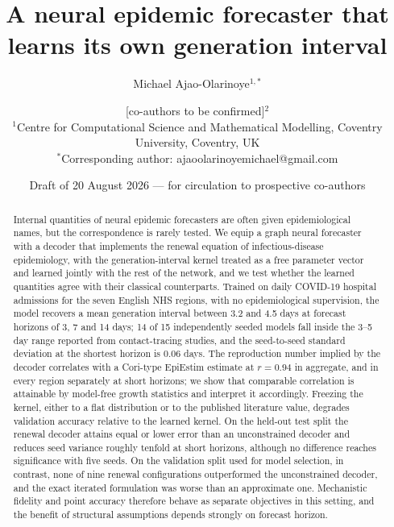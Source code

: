 \documentclass[10pt,letterpaper]{article}
\title{\vspace{-1.2em}\textbf{A neural epidemic forecaster that learns its own
generation interval}}
\author{%
Michael Ajao-Olarinoye$^{1,\ast}$ \and
[co-authors to be confirmed]$^{2}$\\[0.6em]
\small $^{1}$Centre for Computational Science and Mathematical Modelling,
Coventry University, Coventry, UK\\
\small $^{\ast}$Corresponding author: ajaoolarinoyemichael@gmail.com}
\date{Draft of 20 August 2026 --- for circulation to prospective co-authors}
\begin{document}
\maketitle

\begin{abstract}
Internal quantities of neural epidemic forecasters are often given
epidemiological names, but the correspondence is rarely tested. We equip a
graph neural forecaster with a decoder that implements the renewal equation of
infectious-disease epidemiology, with the generation-interval kernel treated
as a free parameter vector and learned jointly with the rest of the network,
and we test whether the learned quantities agree with their classical
counterparts. Trained on daily COVID-19 hospital admissions for the seven
English NHS regions, with no epidemiological supervision, the model recovers a
mean generation interval between 3.2 and 4.5 days at forecast horizons of 3,
7 and 14 days; 14 of 15 independently seeded models fall inside the 3--5 day
range reported from contact-tracing studies, and the seed-to-seed standard
deviation at the shortest horizon is 0.06 days. The reproduction number
implied by the decoder correlates with a Cori-type EpiEstim estimate at
$r=0.94$ in aggregate, and in every region separately at short horizons; we
show that comparable correlation is attainable by model-free growth
statistics and interpret it accordingly. Freezing
the kernel, either to a flat distribution or to the published literature
value, degrades validation accuracy relative to the learned kernel. On the
held-out test split the renewal decoder attains equal or lower error than an
unconstrained decoder and reduces seed variance roughly tenfold at short
horizons, although no difference reaches significance with five seeds. On the
validation split used for model selection, in contrast, none of nine renewal
configurations outperformed the unconstrained decoder, and the exact iterated
formulation was worse than an approximate one. Mechanistic fidelity and point
accuracy therefore behave as separate objectives in this setting, and the
benefit of structural assumptions depends strongly on forecast horizon.
\end{abstract}
\end{document}
